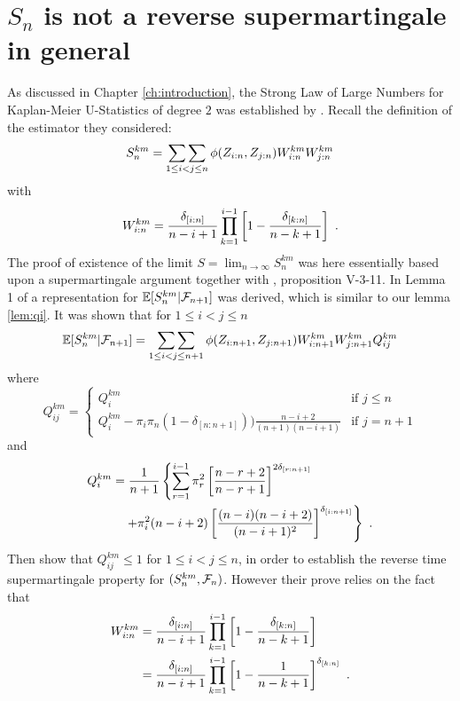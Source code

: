 \section{$S_n$ is not a reverse supermartingale in general} \label{sec:not_supermart}
As discussed in Chapter \ref{ch:introduction}, the Strong Law of Large Numbers for Kaplan-Meier U-Statistics of degree $2$ was established by \cite{bose1999strong}. Recall the definition of the estimator they considered: 
\begin{equation*}
	S_n^{km} = \mathop{\sum\sum}\limits_{1\leq i<j\leq n} \phi(Z_{i:n}, Z_{j:n}) W_{i:n}^{km} W_{j:n}^{km}
\end{equation*}
with
\begin{equation*}
	W_{i:n}^{km} = \frac{\delta_{[i:n]}}{n-i+1}\prod\limits_{k=1}^{i-1}\left[1-\frac{\delta_{[k:n]}}{n-k+1}\right]\textrm{ .}
\end{equation*}
The proof of existence of the limit $S = \lim_{n\to\infty} S_n^{km}$ was here essentially based upon a supermartingale argument together with \cite{neveu1975discrete}, proposition V-3-11. In Lemma 1 of \cite{bose1999strong} a representation for $\mathbb{E}[S_n^{km}| \mathcal{F}_{n+1}]$ was derived, which is similar to our lemma \ref{lem:qi}. It was shown that for $1\leq i<j\leq n$
$$\mathbb{E}[S_n^{km}|\mathcal{F}_{n+1}] = \mathop{\sum\sum}\limits_{1\leq i<j \leq n+1} \phi(Z_{i:n+1},Z_{j:n+1}) W_{i:n+1}^{km}W_{j:n+1}^{km}Q_{ij}^{km}$$
where 
\[Q_{ij}^{km} = \begin{cases} 
Q_i^{km} &\textrm{if } j\leq n \\
Q_i^{km} - \pi_i \pi_n (1-\delta_{[n:n+1]}))\frac{n-i+2}{(n+1)(n-i+1)} &\textrm{if } j=n+1
\end{cases}
\]
and
\begin{align*}
Q_i^{km} &= \frac{1}{n+1} \left\{ \sum\limits_{r=1}^{i-1} \pi_r^2 \left[ \frac{n-r+2}{n-r+1} \right]^{2\delta_{[r:n+1]}} \right.\\
		 & \quad \left. + \pi_i^2 (n-i+2) \left[\frac{(n-i)(n-i+2)}{(n-i+1)^2}\right]^{\delta_{[i:n+1]}} \right\}\textrm{ .}
\end{align*}
%
Then \cite{bose1999strong} show that $Q_{ij}^{km}\leq 1$ for $1\leq i<j\leq n$, in order to establish the reverse time supermartingale property for $(S_n^{km}, \mathcal{F}_n)$. However their prove relies on the fact that 
\begin{align*}
	W_{i:n}^{km} &= \frac{\delta_{[i:n]}}{n-i+1}\prod\limits_{k=1}^{i-1}\left[1-\frac{\delta_{[k:n]}}{n-k+1}\right] \\
				 &= \frac{\delta_{[i:n]}}{n-i+1}\prod\limits_{k=1}^{i-1}\left[1-\frac{1}{n-k+1}\right]^{\delta_{[k:n]}} \textrm{ .}
\end{align*}
